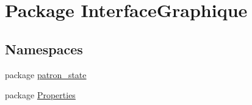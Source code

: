 \hypertarget{namespace_interface_graphique}{\section{Package Interface\-Graphique}
\label{namespace_interface_graphique}
}
\subsection*{Namespaces}
\begin{DoxyCompactItemize}
\item 
package \hyperlink{namespace_interface_graphique_1_1patron__state}{patron\-\_\-state}
\item 
package \hyperlink{namespace_interface_graphique_1_1_properties}{Properties}
\end{DoxyCompactItemize}

